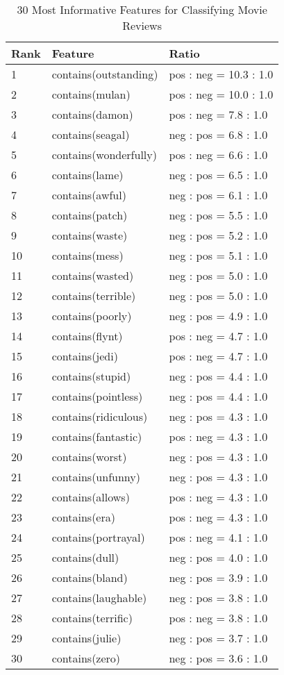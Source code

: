 \documentclass{article}
\begin{document}
\begin{table}
\centering
\begin{tabular}{|l|l|l|}
	\hline
	\textbf{Rank} & \textbf{Feature} & \textbf{Ratio} \\
	\hline
	1 & contains(outstanding) & pos : neg = 10.3 : 1.0 \\
	2 & contains(mulan) & pos : neg = 10.0 : 1.0 \\
	3 & contains(damon) & pos : neg = 7.8 : 1.0 \\
	4 & contains(seagal) & neg : pos = 6.8 : 1.0 \\
	5 & contains(wonderfully) & pos : neg = 6.6 : 1.0 \\
	6 & contains(lame) & neg : pos = 6.5 : 1.0 \\
	7 & contains(awful) & neg : pos = 6.1 : 1.0 \\
	8 & contains(patch) & neg : pos = 5.5 : 1.0 \\
	9 & contains(waste) & neg : pos = 5.2 : 1.0 \\
	10 & contains(mess) & neg : pos = 5.1 : 1.0 \\
	11 & contains(wasted) & neg : pos = 5.0 : 1.0 \\
	12 & contains(terrible) & neg : pos = 5.0 : 1.0 \\
	13 & contains(poorly) & neg : pos = 4.9 : 1.0 \\
	14 & contains(flynt) & pos : neg = 4.7 : 1.0 \\
	15 & contains(jedi) & pos : neg = 4.7 : 1.0 \\
	16 & contains(stupid) & neg : pos = 4.4 : 1.0 \\
	17 & contains(pointless) & neg : pos = 4.4 : 1.0 \\
	18 & contains(ridiculous) & neg : pos = 4.3 : 1.0 \\
	19 & contains(fantastic) & pos : neg = 4.3 : 1.0 \\
	20 & contains(worst) & neg : pos = 4.3 : 1.0 \\
	21 & contains(unfunny) & neg : pos = 4.3 : 1.0 \\
	22 & contains(allows) & pos : neg = 4.3 : 1.0 \\
	23 & contains(era) & pos : neg = 4.3 : 1.0 \\
	24 & contains(portrayal) & pos : neg = 4.1 : 1.0 \\
	25 & contains(dull) & neg : pos = 4.0 : 1.0 \\
	26 & contains(bland) & neg : pos = 3.9 : 1.0 \\
	27 & contains(laughable) & neg : pos = 3.8 : 1.0 \\
	28 & contains(terrific) & pos : neg = 3.8 : 1.0 \\
	29 & contains(julie) & neg : pos = 3.7 : 1.0 \\
	30 & contains(zero) & neg : pos = 3.6 : 1.0 \\
	\hline
\end{tabular}
\caption{30 Most Informative Features for Classifying Movie Reviews}
\label{tab:informative_features_doc_classification}
\end{table}
\end{document}
